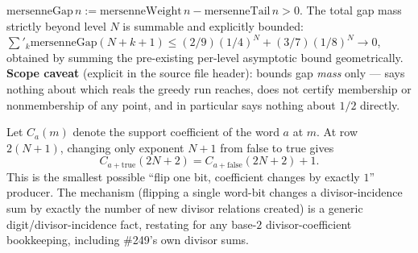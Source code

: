 \begin{lem}
\label{lem:gap-mass-summability}
$\mathrm{mersenneGap}\,n := \mathrm{mersenneWeight}\,n-\mathrm{mersenneTail}\,n>0$. The
total gap mass strictly beyond level $N$ is summable and explicitly bounded:
$\sum'_k\mathrm{mersenneGap}(N{+}k{+}1) \le (2/9)(1/4)^N+(3/7)(1/8)^N\to 0$, obtained by
summing the pre-existing per-level asymptotic bound geometrically. \textbf{Scope
caveat} (explicit in the source file header): bounds gap \emph{mass} only — says
nothing about which reals the greedy run reaches, does not certify membership or
nonmembership of any point, and in particular says nothing about $1/2$ directly.
\par{}
\end{lem}

\begin{lem}
\label{lem:half-divisor-unit-drop}
Let $C_a(m)$ denote the support coefficient of the word $a$ at $m$. At row $2(N+1)$,
changing only exponent $N+1$ from false to true gives
\[
C_{a\mathbin{+}\mathrm{true}}(2N+2)=C_{a\mathbin{+}\mathrm{false}}(2N+2)+1.
\]
This is the smallest possible ``flip one bit, coefficient changes by exactly $1$''
producer. The mechanism (flipping a single word-bit changes a divisor-incidence sum by
exactly the number of new divisor relations created) is a generic digit/divisor-incidence
fact, restating for any base-$2$ divisor-coefficient bookkeeping, including \#249's own
divisor sums.
\par{}
\end{lem}

